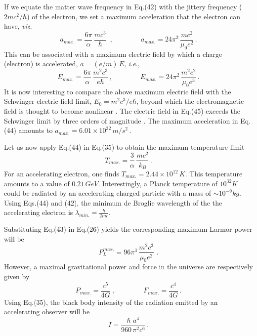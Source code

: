 \documentclass[a4]{epl2}
\begin{document}
If we equate the matter wave frequency in Eq.(42) with the jittery frequency ($2mc^2/\hbar$) of the electron, we set a maximum acceleration that the electron can have, \emph{viz}.
\begin{equation}
a_{max.}=\frac{6\pi}{\alpha}\, \frac{mc^3}{\hbar}\,\,\,,\qquad\qquad a_{max.}=24\pi^2\,\frac{mc^2}{\mu_0e^2}\,.
\end{equation}
This can be associated with a maximum electric field  by which a charge (electron) is accelerated, $a=(e/m)\, E$, \emph{i.e}.,
\begin{equation}
E_{max.}=\frac{6\pi}{\alpha}\,\frac{m^2c^3}{e\hbar}\,,\qquad\qquad E_{max.}=24\pi^2\,\frac{m^2c^2}{\mu_0e^3}\,.
\end{equation}
It is now interesting to compare the above maximum electric field  with the Schwinger  electric field limit, $E_0=m^2c^3/e\hbar$,  beyond which the electromagnetic field is thought to become nonlinear \textcolor[rgb]{0.00,0.07,1.00}{\cite{schwinger,schwinger2}}. The electric field in Eq.(45) exceeds the Schwinger limit by three orders of magnitude \textcolor[rgb]{0.00,0.07,1.00}{\cite{schwinger1}}. The maximum acceleration in Eq.(44) amounts to $a_{max.}=6.01\times 10^{32}\, m/s^2$\,.

Let us now apply Eq.(44) in Eq.(35) to obtain the maximum temperature limit
$$T_{max.}=\frac{3}{\alpha}\, \frac{mc^2}{k_B}\,.$$
For an accelerating electron, one finds $T_{max.}=2.44\times 10^{12}\, K$. This temperature amounts to a value of $0.21\, GeV$. Interestingly, a Planck temperature of $10^{32}K$ could be radiated by an accelerating charged particle with a mass of $\sim 10^{-9}kg$. Using Eqs.(44) and (42), the minimum de Broglie wavelength of the the accelerating electron is $\lambda_{min.}=\frac{\hbar}{2mc}$.

Substituting Eq.(43) in Eq.(26) yields the corresponding maximum Larmor power will be
\begin{equation}
P^{max.}_L=96\pi^3\,\frac{m^2c^3}{\mu_0e^2}\,\,.
\end{equation}
However, a maximal gravitational power and force in the universe are respectively  given by
\begin{equation}
P_{max.}=\frac{c^5}{4G}\,\,,\qquad\qquad F_{max.}=\frac{c^4}{4G}\,.
\end{equation}
Using Eq.(35), the black body intensity of the radiation emitted by an accelerating observer will be
\begin{equation}
I=\frac{\hbar\,\,a^4}{960\,\pi^2c^6}\,.
\end{equation}
\end{document}

